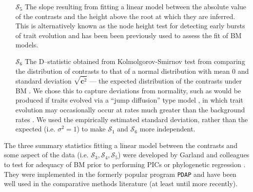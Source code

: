 \documentclass[12pt]{article}
\begin{document}
\begin{enumerate}
\item[$\mathcal{S}_5$] The slope resulting from fitting a linear model between the absolute value of the contrasts and the height above the root at which they are inferred. This is alternatively known as the node height test \citep{FreckletonHarvey2006, SlaterPennell} for detecting early bursts of trait evolution and has been been previously used to assess the fit of BM models.

\item[$\mathcal{S}_6$] The D--statistic obtained from Kolmolgorov-Smirnov test \citep{ks} from comparing the distribution of contrasts to that of a normal distribution with mean 0 and standard deviation $\sqrt{\overline{\mathbf{c}^2}}$ --- the expected distribution of the contrasts under BM \citep{Felsenstein1985, Rohlf2001}. We chose this to capture deviations from normality, such as would be produced if traits evolved via a ``jump diffusion'' type model \citep{Landis2013, Eastmanjump}, in which trait evolution may occasionally occur at rates much greater than the background rates \citep[see][]{PennellPE}. We used the empirically estimated standard deviation, rather than the expected (i.e. $\sigma^2=1$) to make $\mathcal{S}_1$ and $\mathcal{S}_6$ more independent.

\end{enumerate}

The three summary statistics fitting a linear model between the contrasts and some aspect of the data (i.e. $\mathcal{S}_3, \mathcal{S}_4, \mathcal{S}_5$) were developed by Garland and colleagues \citep{Garland1992, Garland1993,  Diaz1996} to test for adequacy of BM prior to performing PICs \citep{Felsenstein1985} or phylogenetic regression \citep{Grafen1989}. They were implemented in the formerly popular program \texttt{PDAP} \citep{GarlandPDAP, Midford2005} and have been well used in the comparative methods literature (at least until more recently).
\end{document}

